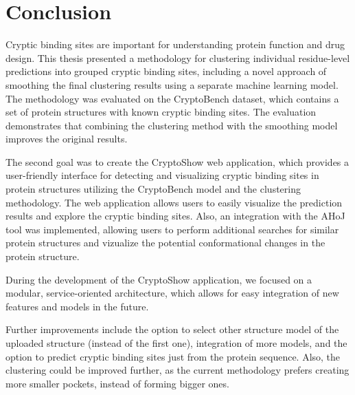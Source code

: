 \chapter*{Conclusion}

Cryptic binding sites are important for understanding protein function and drug design. This thesis presented a methodology for clustering individual residue-level predictions into grouped cryptic binding sites, including a novel approach of smoothing the final clustering results using a separate machine learning model. The methodology was evaluated on the CryptoBench dataset, which contains a set of protein structures with known cryptic binding sites. The evaluation demonstrates that combining the clustering method with the smoothing model improves the original results.

The second goal was to create the CryptoShow web application, which provides a user-friendly interface for detecting and visualizing cryptic binding sites in protein structures utilizing the CryptoBench model and the clustering methodology. The web application allows users to easily visualize the prediction results and explore the cryptic binding sites. Also, an integration with the AHoJ tool was implemented, allowing users to perform additional searches for similar protein structures and vizualize the potential conformational changes in the protein structure.

During the development of the CryptoShow application, we focused on a modular, service-oriented architecture, which allows for easy integration of new features and models in the future.

Further improvements include the option to select other structure model of the uploaded structure (instead of the first one), integration of more models, and the option to predict cryptic binding sites just from the protein sequence. Also, the clustering could be improved further, as the current methodology prefers creating more smaller pockets, instead of forming bigger ones.
